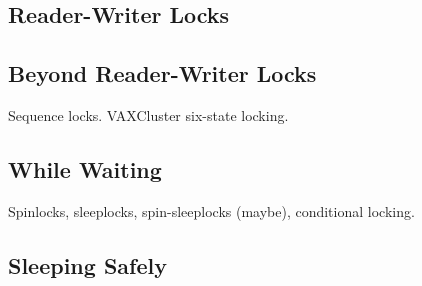 \subsection{Reader-Writer Locks}
\label{sec:locking:Reader-Writer Locks}

\subsection{Beyond Reader-Writer Locks}
\label{sec:locking:Beyond Reader-Writer Locks}

Sequence locks.  VAXCluster six-state locking.

\subsection{While Waiting}
\label{sec:locking:While Waiting}

Spinlocks, sleeplocks, spin-sleeplocks (maybe), conditional locking.

\subsection{Sleeping Safely}
\label{sec:locking:Sleeping Safely}



